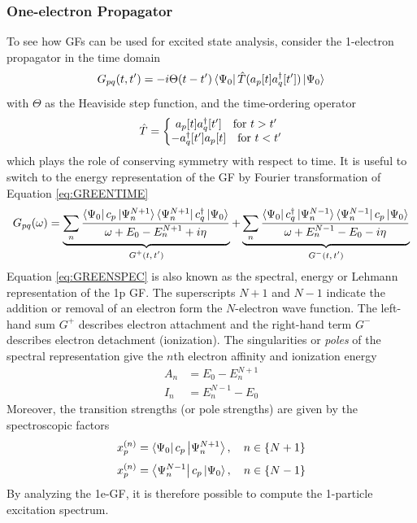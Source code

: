 \subsubsection{One-electron Propagator}

To see how GFs can be used for excited state analysis, consider the 1-electron propagator in the time domain
\begin{equation}
G_{pq}(t,t') = - i\Theta(t-t') \bra{\smash{\Psi_0}} \hat{T}(a_p[t]a
_q^{\dagger}[t']) \ket{\smash{\Psi_0}}
\label{eq:GREENTIME}
\end{equation}
\noindent with $\Theta$ as the Heaviside step function, and the time-ordering operator 
\begin{equation}
\hat{T} = \left\lbrace \begin{matrix}
a_p[t] a_q^{\dagger}[t'] \quad \textrm{for } t > t' \\
-a_q^{\dagger}[t'] a_p[t] \quad \textrm{for } t < t'
\end{matrix}
\right.
\end{equation}
\noindent which plays the role of conserving symmetry with respect to time. It is useful to switch to the energy representation of the GF by Fourier transformation of Equation \ref{eq:GREENTIME}
\begin{equation}
G_{pq} (\omega) = \underbrace{ \sum_n \frac{
	\bra{\smash{\Psi_0}} c_p \ket{\smash{\Psi_n^{N+1}}}			    \bra{\smash{\Psi_n^{N+1}}} c_q ^{\dagger} \ket{\smash{\Psi_0}} 
}{
	\omega + E_0 - E_n^{N+1} + i \eta
}
}_{\text{$G^{+}(t,t')$}} + 
\underbrace{
\sum_n \frac{
	\bra{\smash{\Psi_0}} c_q ^{\dagger} \ket{\smash{\Psi_n^{N-1}}}			    \bra{\smash{\Psi_n^{N-1}}} c_p \ket{\smash{\Psi_0}}
}{
	\omega + E_n^{N-1} - E_0 - i \eta
}
}_{\text{$G^{-}(t,t')$}}
\label{eq:GREENSPEC}
\end{equation}
\noindent Equation \ref{eq:GREENSPEC} is also known as the spectral, energy or Lehmann representation of the 1p GF. The superscripts $N+1$ and $N-1$ indicate the addition or removal of an electron form the $N$-electron wave function. The left-hand sum $G^{+}$ describes electron attachment and the right-hand term $G^{-}$ describes electron detachment (ionization). The singularities or \emph{poles} of the spectral representation give the $n$th electron affinity and ionization energy 
\begin{align}
A_n &= E_0 - E_n^{N+1} \\
I_n &= E_n^{N-1} - E_0
\end{align}
\noindent Moreover, the transition strengths (or pole strengths) are given by the spectroscopic factors 
\begin{equation}
x_p^{(n)} = \bra{\Psi_0 } c_p \ket{\Psi_n ^{N+1} }, \quad n \in \left\lbrace N + 1 \right\rbrace
\end{equation}
\begin{equation}
x_p^{(n)} = \bra{\Psi_n^{N-1} } c_p \ket{\Psi_0 }, \quad n \in \left\lbrace N - 1 \right\rbrace
\end{equation}
\noindent By analyzing the 1e-GF, it is therefore possible to compute the 1-particle excitation spectrum. 

